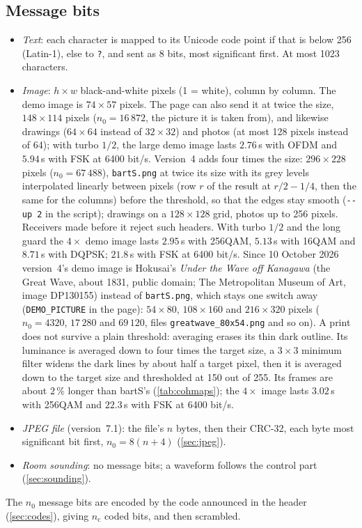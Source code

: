 \documentclass[11pt,a4paper]{article}
\newcommand{\code}[1]{\texttt{#1}}
\newcommand{\nc}{n_{\mathrm{c}}}
\newcommand{\nz}{n_{0}}
\theoremstyle{remark}
\begin{document}
\subsection{Message bits}
\begin{itemize}
\item \emph{Text}: each character is mapped to its Unicode code point if that is below 256 (Latin-1), else to \code{?}, and sent as 8 bits, most significant first. At most 1023 characters.
\item \emph{Image}: $h \times w$ black-and-white pixels (1 = white), column by column. The demo image is $74 \times 57$ pixels. The page can also send it at twice the size, $148 \times 114$ pixels ($\nz = 16\,872$, the picture it is taken from), and likewise drawings ($64 \times 64$ instead of $32 \times 32$) and photos (at most 128 pixels instead of 64); with turbo $1/2$, the large demo image lasts $2.76$\,s with OFDM and $5.94$\,s with FSK at 6400 bit/s. Version~4 adds four times the size: $296 \times 228$ pixels ($\nz = 67\,488$), \code{bartS.png} at twice its size with its grey levels interpolated linearly between pixels (row $r$ of the result at $r/2 - 1/4$, then the same for the columns) before the threshold, so that the edges stay smooth (\code{-{}-up 2} in the script); drawings on a $128 \times 128$ grid, photos up to 256 pixels. Receivers made before it reject such headers. With turbo $1/2$ and the long guard the $4\times$ demo image lasts $2.95$\,s with 256QAM, $5.13$\,s with 16QAM and $8.71$\,s with DQPSK; $21.8$\,s with FSK at 6400 bit/s. Since 10 October 2026 version~4's demo image is Hokusai's \emph{Under the Wave off Kanagawa} (the Great Wave, about 1831, public domain; The Metropolitan Museum of Art, image DP130155) instead of \code{bartS.png}, which stays one switch away (\code{DEMO\_PICTURE} in the page): $54 \times 80$, $108 \times 160$ and $216 \times 320$ pixels ($\nz = 4320$, $17\,280$ and $69\,120$, files \code{greatwave\_80x54.png} and so on). A print does not survive a plain threshold: averaging erases its thin dark outline. Its luminance is averaged down to four times the target size, a $3 \times 3$ minimum filter widens the dark lines by about half a target pixel, then it is averaged down to the target size and thresholded at 150 out of 255. Its frames are about $2\,\%$ longer than bartS's (\cref{tab:cohmaps}); the $4\times$ image lasts $3.02$\,s with 256QAM and $22.3$\,s with FSK at 6400 bit/s.
\item \emph{JPEG file} (version~7.1): the file's $n$ bytes, then their CRC-32, each byte most significant bit first, $\nz = 8(n + 4)$ (\cref{sec:jpeg}).
\item \emph{Room sounding}: no message bits; a waveform follows the control part (\cref{sec:sounding}).
\end{itemize}
The $\nz$ message bits are encoded by the code announced in the header (\cref{sec:codes}), giving $\nc$ coded bits, and then scrambled.
\end{document}
